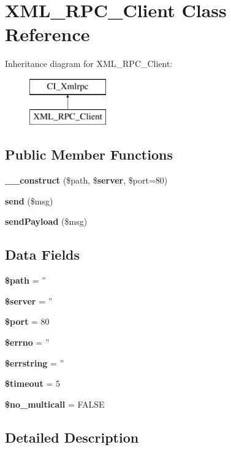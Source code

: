 \section{X\-M\-L\-\_\-\-R\-P\-C\-\_\-\-Client Class Reference}
\label{class_x_m_l___r_p_c___client}
Inheritance diagram for X\-M\-L\-\_\-\-R\-P\-C\-\_\-\-Client\-:\begin{figure}[H]
\begin{center}
\leavevmode
\includegraphics[height=2.000000cm]{class_x_m_l___r_p_c___client}
\end{center}
\end{figure}
\subsection*{Public Member Functions}
\begin{DoxyCompactItemize}
\item 
{\bf \-\_\-\-\_\-construct} (\$path, \${\bf server}, \$port=80)
\item 
{\bf send} (\$msg)
\item 
{\bf send\-Payload} (\$msg)
\end{DoxyCompactItemize}
\subsection*{Data Fields}
\begin{DoxyCompactItemize}
\item 
{\bf \$path} = ''
\item 
{\bf \$server} = ''
\item 
{\bf \$port} = 80
\item 
{\bf \$errno} = ''
\item 
{\bf \$errstring} = ''
\item 
{\bf \$timeout} = 5
\item 
{\bf \$no\-\_\-multicall} = F\-A\-L\-S\-E
\end{DoxyCompactItemize}


\subsection{Detailed Description}


